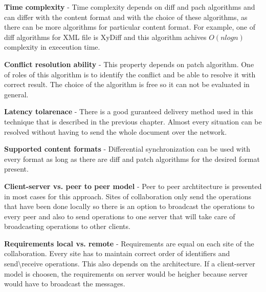 \documentclass[12pt,oneside]{fithesis2}
\begin{document}
\vspace{3mm}

\textbf{Time complexity} - Time complexity depends on diff and pach algorithms and can differ with the content format and with the choice of these algorithms, as there can be more algorithms for particular content format. For example, one of diff algorithms for XML file is XyDiff\cite{Xdiff} and this algorithm achives \(O(nlogn)\) complexity in execeution time.

\vspace{3mm}

\textbf{Conflict resolution ability} - This property depends on patch algorithm. One of roles of this algorithm is to identify the conflict and be able to resolve it with correct result. The choice of the algorithm is free so it can not be evaluated in general.

\vspace{3mm}

\textbf{Latency tolarenace} - There is a good guranteed delivery method used in this technique that is described in the previous chapter. Almost every situation can be resolved without having to send the whole document over the network.

\vspace{3mm}

\textbf{Supported content formats} - Differential synchronization can be used with every format as long as there are diff and patch algorithms for the desired format present.

\vspace{3mm} 

\par \textbf{\underline{}}

\vspace{3mm} 

\textbf{Client-server vs. peer to peer model} - Peer to peer archtitecture is presented in most cases for this approach. Sites of collaboration only send the operations that have been done locally so there is an option to broadcast the operations to every peer and also to send operations to one server that will take care of broadcasting operations to other clients.

\vspace{3mm} 

\textbf{Requirements local vs. remote} - Requirements are equal on each site of the collaboration. Every site has to maintain correct order of identifiers and send\textbackslash receive operations. This also depends on the architecture. If a client-server model is choosen, the requirements on server would be heigher because server would have to broadcast the messages.
\end{document}
